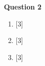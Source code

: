 \par
\noindent
\textbf{Question 2}\\
\begin{enumerate}[label=(\roman*)]

    \item \hfill [3]

    \item \hfill [3]

    \item \hfill [3]

\end{enumerate}

